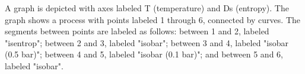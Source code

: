 A graph is depicted with axes labeled T (temperature) and Ds (entropy). The graph shows a process with points labeled 1 through 6, connected by curves. The segments between points are labeled as follows: between 1 and 2, labeled "isentrop"; between 2 and 3, labeled "isobar"; between 3 and 4, labeled "isobar (0.5 bar)"; between 4 and 5, labeled "isobar (0.1 bar)"; and between 5 and 6, labeled "isobar".